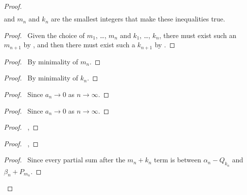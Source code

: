 \documentclass{book}
\let\qed\relax
\theoremstyle{definition}
\begin{document}
\begin{proof}
{\begin{align*}
\end{align*}
and $m_n$ and $k_n$ are the smallest integers that make these inequalities true.}
\begin{proof}
	\pf\ Given the choice of $m_1$, \ldots, $m_n$ and $k_1$, \ldots, $k_n$, there must exist such an $m_{n+1}$ by , and then there must exist such a $k_{n+1}$ by .
\end{proof}
\begin{proof}
	\pf\ By minimality of $m_n$.
\end{proof}
\begin{proof}
	\pf\ By minimality of $k_n$.
\end{proof}
\begin{proof}
	\pf\ Since $a_n \rightarrow 0$ as $n \rightarrow \infty$.
\end{proof}
\begin{proof}
	\pf\ Since $a_n \rightarrow 0$ as $n \rightarrow \infty$.
\end{proof}
\begin{proof}
	\pf\ , 
\end{proof}
\begin{proof}
	\pf\ , 
\end{proof}
\begin{proof}
	\pf\ Since every partial sum after the $m_n + k_n$ term is between $\alpha_n - Q_{k_n}$ and $\beta_n + P_{m_n}$.
\end{proof}
\qed
\end{proof}
\end{document}
